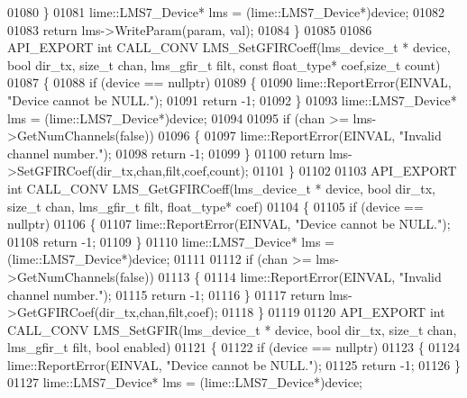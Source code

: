 \begin{DoxyCode}
01080     \}
01081     lime::LMS7_Device* lms = (lime::LMS7_Device*)device;
01082 
01083     \textcolor{keywordflow}{return} lms->WriteParam(param, val);
01084 \}
01085 
01086 API_EXPORT \textcolor{keywordtype}{int} CALL_CONV LMS_SetGFIRCoeff(lms_device_t * device, \textcolor{keywordtype}{bool} dir_tx, \textcolor{keywordtype}{size\_t} 
      chan, lms_gfir_t filt, \textcolor{keyword}{const} float_type* coef,\textcolor{keywordtype}{size\_t} count)
01087 \{
01088     \textcolor{keywordflow}{if} (device == \textcolor{keyword}{nullptr})
01089     \{
01090         lime::ReportError(EINVAL, \textcolor{stringliteral}{"Device cannot be NULL."});
01091         \textcolor{keywordflow}{return} -1;
01092     \}
01093     lime::LMS7_Device* lms = (lime::LMS7_Device*)device;
01094 
01095     \textcolor{keywordflow}{if} (chan >= lms->GetNumChannels(\textcolor{keyword}{false}))
01096     \{
01097         lime::ReportError(EINVAL, \textcolor{stringliteral}{"Invalid channel number."});
01098         \textcolor{keywordflow}{return} -1;
01099     \}
01100     \textcolor{keywordflow}{return} lms->SetGFIRCoef(dir\_tx,chan,filt,coef,count);
01101 \}
01102 
01103 API_EXPORT \textcolor{keywordtype}{int} CALL_CONV LMS_GetGFIRCoeff(lms_device_t * device, \textcolor{keywordtype}{bool} dir_tx, \textcolor{keywordtype}{size\_t} 
      chan, lms_gfir_t filt, float_type* coef)
01104 \{
01105     \textcolor{keywordflow}{if} (device == \textcolor{keyword}{nullptr})
01106     \{
01107         lime::ReportError(EINVAL, \textcolor{stringliteral}{"Device cannot be NULL."});
01108         \textcolor{keywordflow}{return} -1;
01109     \}
01110     lime::LMS7_Device* lms = (lime::LMS7_Device*)device;
01111 
01112     \textcolor{keywordflow}{if} (chan >= lms->GetNumChannels(\textcolor{keyword}{false}))
01113     \{
01114         lime::ReportError(EINVAL, \textcolor{stringliteral}{"Invalid channel number."});
01115         \textcolor{keywordflow}{return} -1;
01116     \}
01117     \textcolor{keywordflow}{return} lms->GetGFIRCoef(dir\_tx,chan,filt,coef);
01118 \}
01119 
01120 API_EXPORT \textcolor{keywordtype}{int} CALL_CONV LMS_SetGFIR(lms_device_t * device, \textcolor{keywordtype}{bool} dir_tx, \textcolor{keywordtype}{size\_t} 
      chan, lms_gfir_t filt, \textcolor{keywordtype}{bool} enabled)
01121 \{
01122     \textcolor{keywordflow}{if} (device == \textcolor{keyword}{nullptr})
01123     \{
01124         lime::ReportError(EINVAL, \textcolor{stringliteral}{"Device cannot be NULL."});
01125         \textcolor{keywordflow}{return} -1;
01126     \}
01127     lime::LMS7_Device* lms = (lime::LMS7_Device*)device;

\end{DoxyCode}
